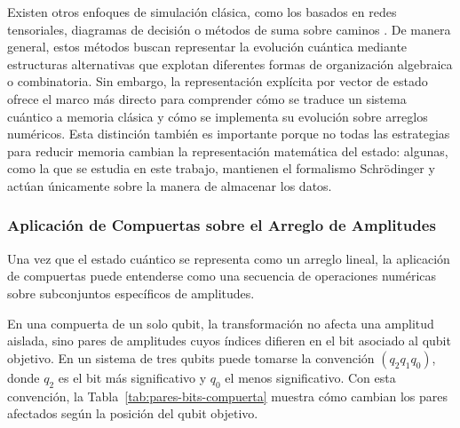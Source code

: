 Existen otros enfoques de simulación clásica, como los basados en redes tensoriales, diagramas de decisión o métodos de suma sobre caminos \parencite{Vidal2003,Viamontes2003,Chen2018}. De manera general, estos métodos buscan representar la evolución cuántica mediante estructuras alternativas que explotan diferentes formas de organización algebraica o combinatoria. Sin embargo, la representación explícita por vector de estado ofrece el marco más directo para comprender cómo se traduce un sistema cuántico a memoria clásica y cómo se implementa su evolución sobre arreglos numéricos. Esta distinción también es importante porque no todas las estrategias para reducir memoria cambian la representación matemática del estado: algunas, como la que se estudia en este trabajo, mantienen el formalismo Schr\"odinger y actúan únicamente sobre la manera de almacenar los datos.

\subsubsection{Aplicación de Compuertas sobre el Arreglo de Amplitudes}

Una vez que el estado cuántico se representa como un arreglo lineal, la aplicación de compuertas puede entenderse como una secuencia de operaciones numéricas sobre subconjuntos específicos de amplitudes.

En una compuerta de un solo qubit, la transformación no afecta una amplitud aislada, sino pares de amplitudes cuyos índices difieren en el bit asociado al qubit objetivo. En un sistema de tres qubits puede tomarse la convención $(q_2 q_1 q_0)$, donde $q_2$ es el bit más significativo y $q_0$ el menos significativo. Con esta convención, la Tabla~\ref{tab:pares-bits-compuerta} muestra cómo cambian los pares afectados según la posición del qubit objetivo.

